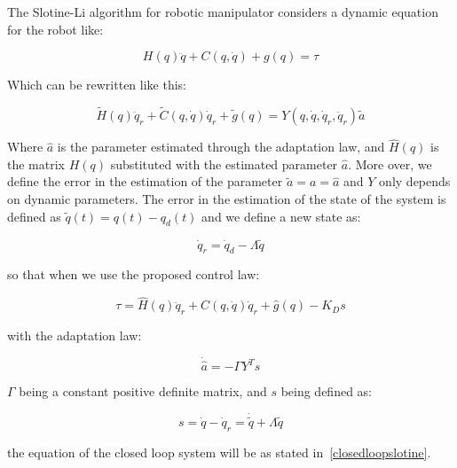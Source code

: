 \documentclass[journal]{IEEEtran}
\begin{document}
        The Slotine-Li algorithm for robotic manipulator considers a dynamic equation for the robot like:

        \begin{equation}
            H(q) \ddot{q} + C(q, \dot{q}) + g(q) = \tau
        \end{equation}

        Which can be rewritten like this:

        \begin{equation} \label{closedloopslotine}
            \tilde{H}(q) \ddot{q}_r + \tilde{C}(q, \dot{q}) \dot{q}_r + \tilde{g}(q) = Y(q, \dot{q}, \dot{q}_r, \ddot{q}_r) \tilde{a}
        \end{equation}

        Where $\hat{a}$ is the parameter estimated through the adaptation law, and $\hat{H}(q)$ is the matrix $H(q)$ substituted with the estimated parameter $\hat{a}$. More over, we define the error in the estimation of the parameter $\tilde{a} = a = \hat{a}$ and $Y$ only depends on dynamic parameters. The error in the estimation of the state of the system is defined as $\tilde{q}(t) = q(t) - q_d(t)$ and we define a new state as:

        \begin{equation}
            \dot{q}_r = \dot{q}_d - \Lambda \tilde{q}
        \end{equation}

        so that when we use the proposed control law:

        \begin{equation}
            \tau = \hat{H}(q) \ddot{q}_r + \hat{C}(q, \dot{q}) \dot{q}_r + \hat{g}(q) - K_D s
        \end{equation}

        with the adaptation law:

        \begin{equation}
            \dot{\hat{a}} = - \Gamma Y^T s
        \end{equation}

        $\Gamma$ being a constant positive definite matrix, and $s$ being defined as:

        \begin{equation}
            s = \dot{q} - \dot{q}_r = \dot{\tilde{q}} + \Lambda \tilde{q}
        \end{equation}

        the equation of the closed loop system will be as stated in~\ref{closedloopslotine}.
\end{document}
